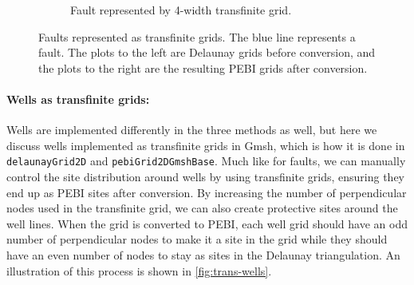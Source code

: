 \begin{figure}[htp]
\begin{subfigure}[b]{\textwidth}
\begin{subfigure}[b]{0.35\textwidth}
        \end{subfigure}
        \caption{Fault represented by 4-width transfinite grid.}
        \label{fig:trans-fault-2}
    \end{subfigure}
    \caption[Faults represented as transfinite grids.]{Faults represented as transfinite grids. The blue line represents a fault. The plots to the left are Delaunay grids before conversion, and the plots to the right are the resulting PEBI grids after conversion.}
    \label{fig:trans-faults}
\end{figure}

\paragraph{Wells as transfinite grids:}
Wells are implemented differently in the three methods as well, but here we discuss wells implemented as transfinite grids in Gmsh, which is how it is done in \verb|delaunayGrid2D| and \verb|pebiGrid2DGmshBase|. Much like for faults, we can manually control the site distribution around wells by using transfinite grids, ensuring they end up as PEBI sites after conversion. By increasing the number of perpendicular nodes used in the transfinite grid, we can also create protective sites around the well lines. When the grid is converted to PEBI, each well grid should have an odd number of perpendicular nodes to make it a site in the grid while they should have an even number of nodes to stay as sites in the Delaunay triangulation. An illustration of this process is shown in \autoref{fig:trans-wells}.

